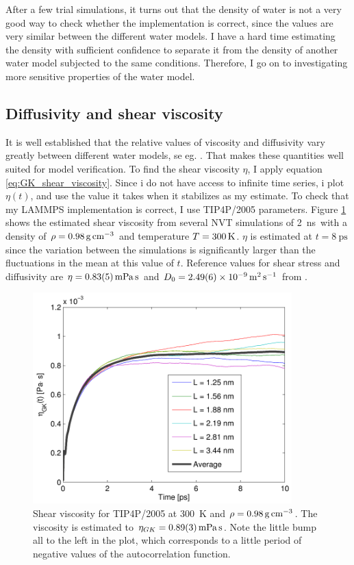 After a few trial simulations, it turns out that the density of water is not a very good way to check whether the implementation is correct, since the values are very similar between the different water models. I have a hard time estimating the density with sufficient confidence to separate it from the density of another water model subjected to the same conditions. Therefore, I go on to investigating more sensitive properties of the water model.

\subsection{Diffusivity and shear viscosity}
It is well established that the relative values of viscosity and diffusivity vary greatly between different water models, se eg. \cite{Gonzalez2010,Tazi2012}. That makes these quantities well suited for model verification. To find the shear viscosity $\eta$, I apply equation \ref{eq:GK_shear_viscosity}. Since i do not have access to infinite time series, i plot $\eta(t)$, and use the value it takes when it stabilizes as my estimate. To check that my LAMMPS implementation is correct, I use TIP4P/2005 parameters.  Figure \ref{fig:shear_viscosity_tip4p/2005} shows the estimated shear viscosity from several NVT simulations of \SI{2}{\nano\second} with a density of $\rho = \text{\SI{0.98}{\gram\per\cubic\cm}}$ and temperature $T=\text{\SI{300}{\kelvin}}$. $\eta$ is estimated at $t = \SI{8}{\pico\second}$ since the variation between the simulations is significantly larger than the fluctuations in the mean at this value of $t$. Reference values for shear stress and diffusivity are $\eta = \text{\SI{0.83 \pm 0.05}{\milli\pascal\second}}$ and $D_0 = \text{\SI{2.49 \pm 0.06d-9}{\metre\squared\per\second}}$ from \cite{Tazi2012}.

\begin{figure}
\centering
\includegraphics[width=10cm]{../figures/thesis/viscosity_green_kubo_tip4p_2005.pdf}
\caption{Shear viscosity for TIP4P/2005 at \SI{300}{\kelvin} and $\rho = \text{\SI{0.98}{\gram\per\cubic\cm}}$. The viscosity is estimated to $\eta_{GK} = \text{\SI{0.89\pm0.03}{\milli\pascal\second}}$. Note the little bump all to the left in the plot, which corresponds to a little period of negative values of the autocorrelation function.}
\label{fig:shear_viscosity_tip4p/2005}
\end{figure}

